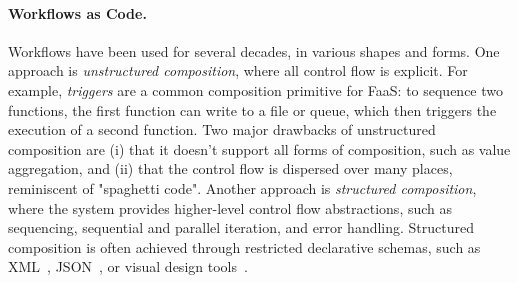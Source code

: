 
\paragraph{Workflows as Code.}
%
Workflows have been used for several decades, in various shapes and forms.
One approach is \emph{unstructured composition}, where all control flow is explicit. For example, \emph{triggers} are a common composition primitive for FaaS: to sequence two functions, the first function can write to a file or queue, which then triggers the execution of a second function. Two major drawbacks of unstructured composition are (i) that it doesn't support all forms of composition, such as value aggregation, and (ii) that the control flow is dispersed over many places, reminiscent of "spaghetti code". Another approach is \emph{structured composition}, where the system provides higher-level control flow abstractions, such as sequencing, sequential and parallel iteration, and error handling. Structured composition is often achieved through restricted declarative schemas, such as XML~\cite{shegalov2001xml}, JSON~\cite{step-functions}, or visual design tools~\cite{azure-logic-apps}.


